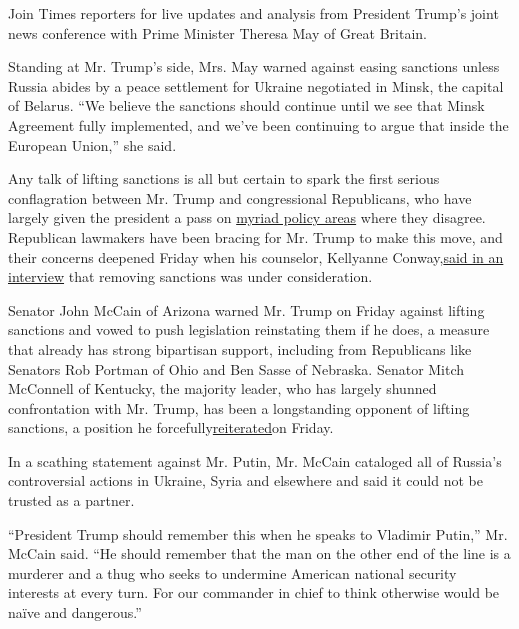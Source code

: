 Join Times reporters for live updates and analysis from President
Trump's joint news conference with Prime Minister Theresa May of Great
Britain.

Standing at Mr. Trump's side, Mrs. May warned against easing sanctions
unless Russia abides by a peace settlement for Ukraine negotiated in
Minsk, the capital of Belarus. ``We believe the sanctions should
continue until we see that Minsk Agreement fully implemented, and we've
been continuing to argue that inside the European Union,'' she said.

Any talk of lifting sanctions is all but certain to spark the first
serious conflagration between Mr. Trump and congressional Republicans,
who have largely given the president a pass on
\href{https://mobile.nytimes.com/2017/01/26/us/politics/trump-republican-retreat.html?hp=\&action=click\&pgtype=Homepage\&clickSource=story-heading\&module=b-lede-package-region\&region=top-news\&WT.nav=top-news\&smid=tw-nytpolitics\&smtyp=cur\&referer=https://t.co/MklSBYHS66}{myriad
policy areas} where they disagree. Republican lawmakers have been
bracing for Mr. Trump to make this move, and their concerns deepened
Friday when his counselor, Kellyanne
Conway,\href{https://twitter.com/foxandfriends/status/824966414456852480}{said
in an interview} that removing sanctions was under consideration.

Senator John McCain of Arizona warned Mr. Trump on Friday against
lifting sanctions and vowed to push legislation reinstating them if he
does, a measure that already has strong bipartisan support, including
from Republicans like Senators Rob Portman of Ohio and Ben Sasse of
Nebraska. Senator Mitch McConnell of Kentucky, the majority leader, who
has largely shunned confrontation with Mr. Trump, has been a
longstanding opponent of lifting sanctions, a position he
forcefully\href{http://www.politico.com/story/2017/01/mitch-mcconnell-trump-russia-sanctions-234281}{reiterated}on
Friday.

In a scathing statement against Mr. Putin, Mr. McCain cataloged all of
Russia's controversial actions in Ukraine, Syria and elsewhere and said
it could not be trusted as a partner.

``President Trump should remember this when he speaks to Vladimir
Putin,'' Mr. McCain said. ``He should remember that the man on the other
end of the line is a murderer and a thug who seeks to undermine American
national security interests at every turn. For our commander in chief to
think otherwise would be naïve and dangerous.''

